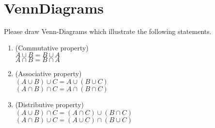 \section{VennDiagrams}
Please draw Venn-Diagrams which illustrate the following statements.
	\begin{enumerate}
		\item (Commutative property)\\
		$A\cup B  = B \cup A$ \\  $A\cap B  = B \cap A$ 
		\item (Associative property)\\
		$(A\cup B) \cup C  = A \cup (B \cup C)$ \\  $(A\cap B) \cap C  = A \cap (B \cap C)$ 
		\item (Distributive property)\\
		$(A \cup B) \cap C = (A\cap C) \cup (B \cap C)$ \\
		$(A \cap B) \cup C = (A\cup C) \cap (B \cup C)$
	\end{enumerate}